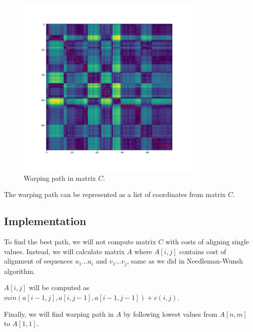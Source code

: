 \begin{figure}[h]
  \centering
  \includegraphics[width=0.8\textwidth]{images/wp}
  \caption{Warping path in matrix $C$.}
  \label{fig:wp}
\end{figure}

The warping path can be represented as a list of coordinates from matrix $C$.

\subsection{Implementation}
To find the best path, we will not compute matrix $C$ with costs of aligning single values.
Instead, we will calculate matrix $A$ where $A[i,j]$ contains cost of alignment of sequences $u_1 \dots u_i$ and $v_1 \dots v_j$, 
same as we did in Needleman-Wunsh algorithm.

$A[i,j]$ will be computed as $min(a[i-1,j],a[i,j-1],a[i-1,j-1])+c(i,j)$. 

Finally, we will find warping path in $A$ by following lowest values from $A[n,m]$ to $A[1,1]$. 

